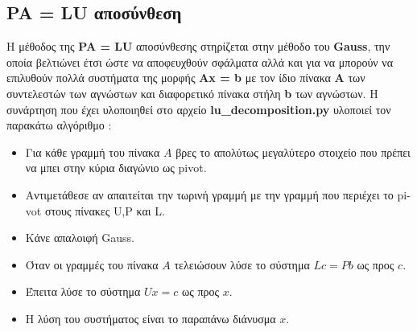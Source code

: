 \documentclass[First Project.tex]{subfiles}
\begin{document}
\subsection{\textlatin{\textbf{PA = LU}} αποσύνθεση}

Η μέθοδος της \textlatin{\textbf{PA = LU}} αποσύνθεσης στηρίζεται στην μέθοδο του \textlatin{\textbf{Gauss}}, την οποία βελτιώνει έτσι ώστε να αποφευχθούν 
σφάλματα αλλά και για να μπορούν να επιλυθούν πολλά συστήματα της μορφής \textlatin{\textbf{Ax = b}} με τον ίδιο πίνακα \textlatin{\textbf{A}} των 
συντελεστών των αγνώστων και διαφορετικό πίνακα στήλη \textlatin{\textbf{b}} των αγνώστων. Η συνάρτηση που έχει υλοποιηθεί στο αρχείο 
\textlatin{\textbf{lu\_decomposition.py}} υλοποιεί τον παρακάτω αλγόριθμο :
\begin{itemize}
    \item Για κάθε γραμμή του πίνακα $Α$ βρες το απολύτως μεγαλύτερο στοιχείο που πρέπει να μπει στην κύρια διαγώνιο ως \textlatin{pivot}.
    \item Αντιμετάθεσε αν απαιτείται την τωρινή γραμμή με την γραμμή που περιέχει το \textlatin{pivot} στους πίνακες \textlatin{U,P} και \textlatin{L}.
    \item Κάνε απαλοιφή \textlatin{Gauss}.
    \item Όταν οι γραμμές του πίνακα $Α$ τελειώσουν λύσε το σύστημα $Lc = Pb$ ως προς $c$.
    \item Έπειτα λύσε το σύστημα $Ux = c$ ως προς $x$.
    \item Η λύση του συστήματος είναι το παραπάνω διάνυσμα $x$.
\end{itemize}
\end{document}
